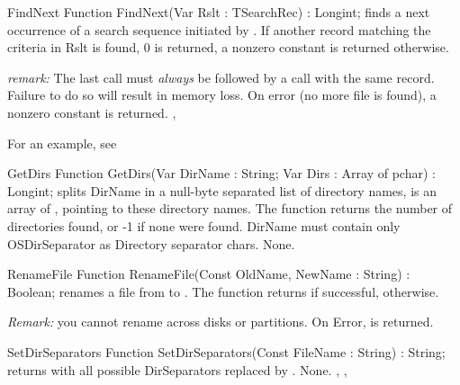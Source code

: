 

\begin{function}{FindNext}
\Declaration
Function FindNext(Var Rslt : TSearchRec) : Longint;
\Description
{} finds a next occurrence of a search sequence initiated by
. If another record matching the criteria in Rslt is found, 0
is returned, a nonzero constant is returned otherwise.

{\em remark:} The last  call must {\em always} be followed by a
 call with the same  record. Failure to do so will
result in memory loss.
\Errors
On error (no more file is found), a nonzero constant is returned.
\SeeAlso
{}, 
\end{function}

For an example, see 

\begin{function}{GetDirs}
\Declaration
Function GetDirs(Var DirName : String; Var Dirs : Array of pchar) : Longint;
\Description
{} splits DirName in a null-byte separated list of directory names,
 is an array of , pointing to these directory names.
The function returns the number of directories found, or -1 if none were found.
DirName must contain only OSDirSeparator as Directory separator chars.
\Errors
None.
\SeeAlso
{}
\end{function}



\begin{function}{RenameFile}
\Declaration
Function RenameFile(Const OldName, NewName : String) : Boolean;
\Description
{} renames a file from  to . The
function returns  if successful,  otherwise.

{\em Remark:} you cannot rename across disks or partitions.
\Errors
On Error,  is returned.
\SeeAlso
{}
\end{function}



\begin{function}{SetDirSeparators}
\Declaration
Function SetDirSeparators(Const FileName : String) : String;
\Description
{} returns  with all possible
DirSeparators replaced by .
\Errors
None.
\SeeAlso
{}, , 
\end{function}

